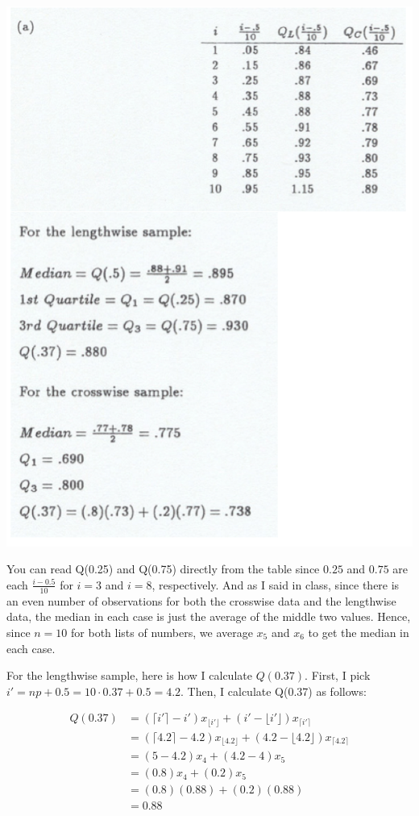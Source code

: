 \documentclass{article}\usepackage{graphicx, color}
\providecommand{\q}{$\quad$ \newline}
\numberwithin{equation}{section}
\begin{document}
\begin{flushleft}
\begin{enumerate}[1. ]
 \includegraphics{../../fig/ch3s2p1sol.png}

\color{red}

You can read Q(0.25) and Q(0.75) directly from the table since $0.25$ and $0.75$ are each $\frac{i - 0.5}{10}$ for $i = 3$ and $i = 8$, respectively. And as I said in class, since there is an even number of observations for both the crosswise data and the lengthwise data, the median in each case is just the average of the middle two values. Hence, since $n = 10$ for both lists of numbers, we average $x_5$ and $x_6$ to get the median in each case. \q

For the lengthwise sample, here is how I calculate $Q(0.37)$. First, I pick $i' = np + 0.5 = 10 \cdot 0.37 + 0.5 = 4.2$. Then, I calculate Q(0.37) as follows:

\begin{align*}
Q(0.37) &= (\lceil i' \rceil - i') x_{\lfloor i' \rfloor} + ( i' - \lfloor i' \rfloor) x_{\lceil i' \rceil} \\
&= (\lceil 4.2 \rceil - 4.2) x_{\lfloor 4.2 \rfloor} + ( 4.2 - \lfloor 4.2 \rfloor) x_{\lceil 4.2 \rceil} \\
&= (5- 4.2) x_{4} + ( 4.2 - 4) x_{5} \\
&= (0.8) x_{4} + (0.2) x_{5} \\
&= (0.8)(0.88) + (0.2)(0.88) \\
&= 0.88
\end{align*}


\end{enumerate}
\end{flushleft}
\end{document}
